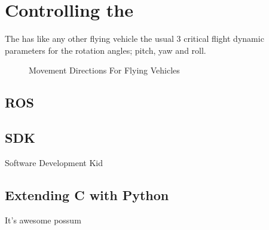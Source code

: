 \section{Controlling the \Ardrone}
The \Ardrone has like any other flying vehicle the usual 3 critical flight dynamic parameters for the rotation angles; pitch, yaw and roll. 

\begin{figure}[h!]
  \centering
  \caption{Movement Directions For Flying Vehicles}
\end{figure}

\subsection{ROS}

\subsection{SDK}
Software Development Kid

\subsection{Extending C with Python}
It's awesome possum

